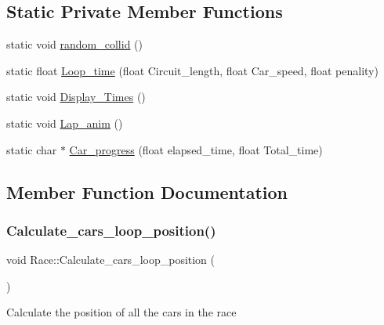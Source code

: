 \subsection*{Static Private Member Functions}
\begin{DoxyCompactItemize}
\item 
static void \hyperlink{class_race_a39c85f002d23e5f69eb41130d56d8a0f}{random\+\_\+collid} ()
\item 
static float \hyperlink{class_race_a75246185d954052dd7a0d19b4fdda1a4}{Loop\+\_\+time} (float Circuit\+\_\+length, float Car\+\_\+speed, float penality)
\item 
static void \hyperlink{class_race_a45900e00f7218173658537ac6a2cda86}{Display\+\_\+\+Times} ()
\item 
static void \hyperlink{class_race_ac1ba3c7832ec62812a2fdd21f7fbd46c}{Lap\+\_\+anim} ()
\item 
static char $\ast$ \hyperlink{class_race_a4ce05f7770cfe6fe888b0a3bbdb87b83}{Car\+\_\+progress} (float elapsed\+\_\+time, float Total\+\_\+time)
\end{DoxyCompactItemize}


\subsection{Member Function Documentation}
\mbox{\label{class_race_a1f46c8f5eb505d88620264f0d8f6b22c}} 
\subsubsection{\texorpdfstring{Calculate\+\_\+cars\+\_\+loop\+\_\+position()}{Calculate\_cars\_loop\_position()}}
{\footnotesize\ttfamily void Race\+::\+Calculate\+\_\+cars\+\_\+loop\+\_\+position (\begin{DoxyParamCaption}{ }\end{DoxyParamCaption})\hspace{0.3cm}{\ttfamily [static]}}

Calculate the position of all the cars in the race \mbox{\label{class_race_a4ce05f7770cfe6fe888b0a3bbdb87b83}} 
